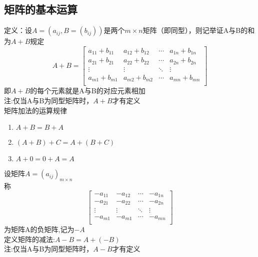 \subsection{矩阵的基本运算}
{\color{red}定义：}设$A=(a_{ij},B=(b_{ij}))$是两个$m\times n$矩阵（即同型），则记举证A与B的和为$A+B$规定
$$
A+B=\left[ \begin{matrix}
    {{a}_{11}}+{{b}_{11}} & {{a}_{12}}+{{b}_{12}} & \cdots  & {{a}_{1n}}+{{b}_{1n}}  \\
   {{a}_{21}}+{{b}_{21}} & {{a}_{22}}+{{b}_{22}} & \cdots  & {{a}_{2n}}+{{b}_{2n}}  \\
   \vdots  & \vdots  & {\ddots} & \vdots   \\
   {{a}_{m1}}+{{b}_{m1}} & {{a}_{m2}}+{{b}_{m2}} & \cdots  & {{a}_{mn}}+{{b}_{mn}}  \\      
\end{matrix} \right]
$$
即$A+B$的每个元素就是A与B的对应元素相加\\
{\color{red}注:\quad}仅当A与B为同型矩阵时，$A+B$才有定义\\
矩阵加法的运算规律
\begin{enumerate}
    \item{
        $A+B=B+A$
    }
    \item{
        $(A+B)+C=A+(B+C)$
    }
    \item {
        $A+0=0+A=A$
    }
\end{enumerate}
设矩阵$A=(a_{ij})_{m\times n}$\\
称
$$
\left[ \begin{matrix}
    -{{a}_{11}} & -{{a}_{12}} & \cdots  &-{{a}_{1n}}  \\
   -{{a}_{21}} & -{{a}_{22}} & \cdots  &-{{a}_{2n}}  \\
   \vdots  & \vdots  & \ddots & \vdots   \\
   -{{a}_{m1}} & -{{a}_{m1}} & \cdots  &-{{a}_{mn}}  \\    
\end{matrix} \right]
$$
为矩阵A的负矩阵,记为$-A$ \\
定义矩阵的减法:$A-B=A+(-B)$\\
{\color{red}注:\quad}仅当A与B为同型矩阵时，$A-B$才有定义\\
